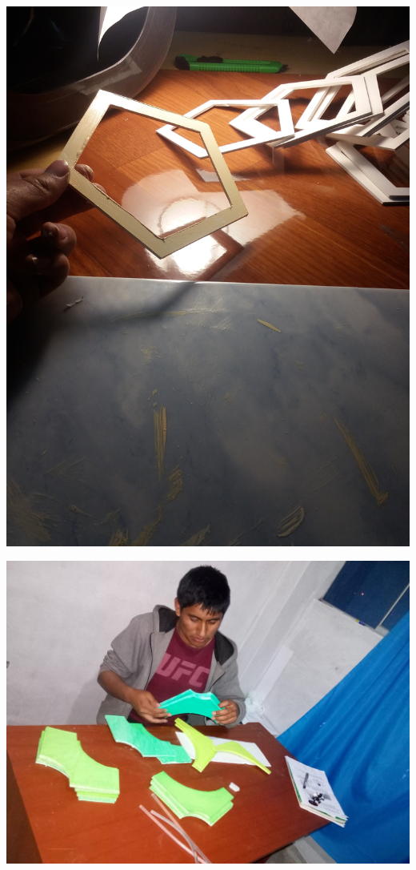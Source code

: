 \documentclass[12pt,]{report}
\begin{document}
\includegraphics{2x.jpg}

\includegraphics{g1.jpg}
\end{document}
